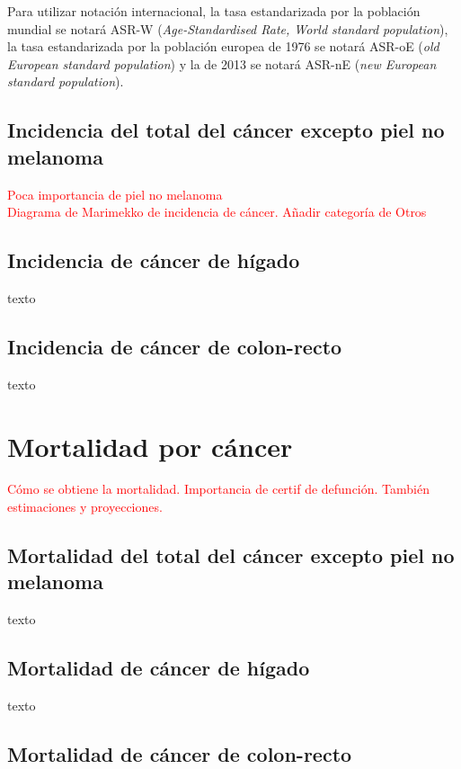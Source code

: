 Para utilizar notación internacional, la tasa estandarizada por la población mundial se notará ASR-W (\textit{Age-Standardised Rate, World standard population}), la tasa estandarizada por la población europea de 1976 se notará ASR-oE (\textit{old European standard population}) y la de 2013 se notará ASR-nE (\textit{new European standard population}).\\

\subsection{Incidencia del total del cáncer excepto piel no melanoma}

\textcolor{red}{Poca importancia de piel no melanoma}\\

\textcolor{red}{Diagrama de Marimekko de incidencia de cáncer. Añadir categoría de Otros}

\subsection{Incidencia de cáncer de hígado}

texto

\subsection{Incidencia de cáncer de colon-recto}

texto

\section{Mortalidad por cáncer}

\textcolor{red}{Cómo se obtiene la mortalidad. Importancia de certif de defunción. También estimaciones y proyecciones.}

\subsection{Mortalidad del total del cáncer excepto piel no melanoma}

texto

\subsection{Mortalidad de cáncer de hígado}

texto

\subsection{Mortalidad de cáncer de colon-recto}

